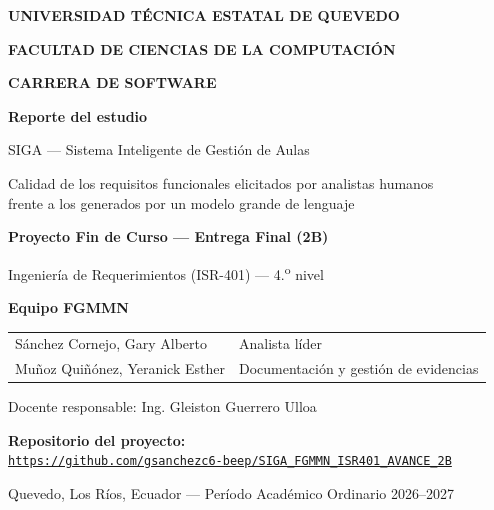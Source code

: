 \documentclass[11pt,a4paper]{article}
\begin{document}
\begin{titlepage}
\centering
\vspace*{1.5cm}

{\bfseries\Large UNIVERSIDAD T\'ECNICA ESTATAL DE QUEVEDO\par}
\vspace{3mm}
{\bfseries\large FACULTAD DE CIENCIAS DE LA COMPUTACI\'ON\par}
\vspace{2mm}
{\bfseries\large CARRERA DE SOFTWARE\par}

\vspace{2cm}
{\bfseries\Large Reporte del estudio\par}
\vspace{5mm}
{\Large SIGA --- Sistema Inteligente de Gesti\'on de Aulas\par}
\vspace{3mm}
{\large Calidad de los requisitos funcionales elicitados por analistas humanos\\
frente a los generados por un modelo grande de lenguaje\par}

\vspace{1.5cm}
{\bfseries Proyecto Fin de Curso --- Entrega Final (2B)\par}
{Ingenier\'ia de Requerimientos (ISR-401) --- 4.\textsuperscript{o} nivel\par}

\vspace{1.5cm}
{\bfseries Equipo FGMMN\par}
\vspace{3mm}
\begin{tabular}{ll}
S\'anchez Cornejo, Gary Alberto      & Analista l\'ider \\
Mu\~noz Qui\~n\'onez, Yeranick Esther & Documentaci\'on y gesti\'on de evidencias \\
\end{tabular}

\vspace{1cm}
{Docente responsable: Ing. Gleiston Guerrero Ulloa\par}

\vfill
{\bfseries Repositorio del proyecto:}\\
\href{https://github.com/gsanchezc6-beep/SIGA_FGMMN_ISR401_AVANCE_2B}{\texttt{https://github.com/gsanchezc6-beep/SIGA\_FGMMN\_ISR401\_AVANCE\_2B}}

\vspace{8mm}
{Quevedo, Los R\'ios, Ecuador --- Per\'iodo Acad\'emico Ordinario 2026--2027\par}
\end{titlepage}
\end{document}
